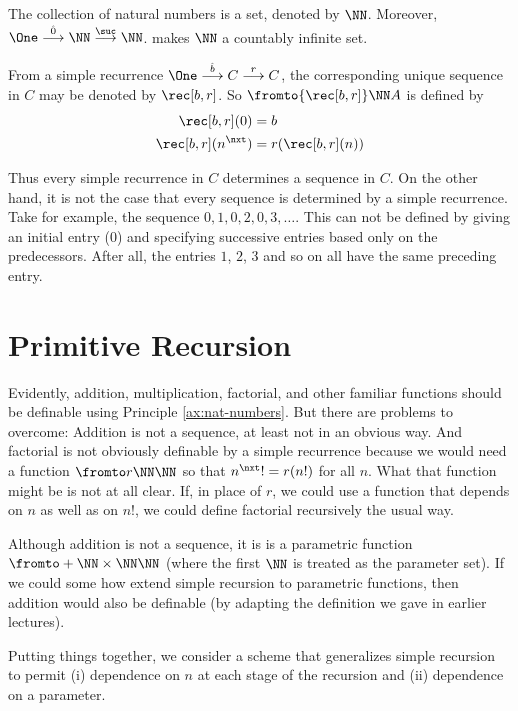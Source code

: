 \begin{principle}\label{ax:nat-numbers}
	The collection of natural numbers is a set, denoted by $\NN$.
	Moreover, $\One \stackrel{\hat{0}}{\longrightarrow} \NN \stackrel{\suc}{\longrightarrow} \NN$.
	makes $\NN$ a countably infinite set.
	
	From a simple recurrence $\One \stackrel{\hat{b}}{\longrightarrow} C \stackrel{r}{\longrightarrow} C$, the corresponding unique sequence in $C$
	may be denoted by $\rec[b,r]$. So $\fromto {\rec[b,r]}\NN A$ is defined by
	\begin{align*}
	\rec[b,r](0) &= b\\
	\rec[b,r](n^\nxt) &= r(\rec[b,r](n))
	\end{align*}
\end{principle}

Thus every simple recurrence in $C$ determines a sequence in $C$. 
On the other hand, it is not the case that every sequence is determined by a simple recurrence. 
Take for example, the sequence $0,1,0,2,0,3,\ldots$. 
This can not be defined by giving an initial entry ($0$) and specifying successive entries based only on the predecessors. 
After all, the entries $1$, $2$, $3$ and so on all have the same preceding entry.

\section{Primitive Recursion}

Evidently, addition, multiplication, factorial, and other familiar functions should be definable using Principle \ref{ax:nat-numbers}. 
But there are problems to overcome: Addition is not a sequence, at least not in an obvious way. And factorial is not obviously definable by a simple recurrence
because we would need a function $\fromto r\NN\NN$ so that $n^\nxt! = r(n!)$
for all $n$. What that function might be is not at all clear. If, in place of $r$, we could use a function that depends on $n$ as well as on $n!$, we could define factorial recursively the usual way.
 
Although addition is not a sequence, it is is a parametric function $\fromto + {\NN\times \NN}\NN$ (where the first $\NN$ is treated as the parameter set).
If we could some how extend simple recursion to parametric functions, then addition would also be definable (by adapting the definition we gave in earlier lectures).

Putting things together, we consider a scheme that generalizes simple recursion to permit (i) dependence on $n$ at each stage of the recursion and (ii) dependence on a parameter.


